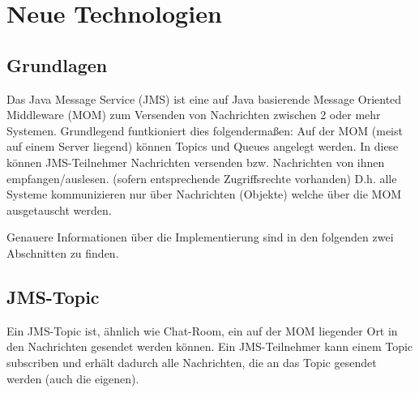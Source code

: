 \documentclass[11pt, a4paper]{article}
\begin{document}
\section{Neue Technologien}
\subsection{Grundlagen}
Das Java Message Service (JMS) ist eine auf Java basierende Message Oriented Middleware (MOM) zum Versenden von Nachrichten zwischen 2 oder mehr Systemen.
Grundlegend funtkioniert dies folgendermaßen:
Auf der MOM (meist auf einem Server liegend) können Topics und Queues angelegt werden.
In diese können JMS-Teilnehmer Nachrichten versenden bzw. Nachrichten von ihnen empfangen/auslesen. (sofern entsprechende Zugriffsrechte vorhanden)
D.h. alle Systeme kommunizieren nur über Nachrichten (Objekte) welche über die MOM ausgetauscht werden.

Genauere Informationen über die Implementierung sind in den folgenden zwei Abschnitten zu finden.

\subsection{JMS-Topic}
Ein JMS-Topic ist, ähnlich wie Chat-Room, ein auf der MOM liegender Ort in den Nachrichten gesendet werden können. Ein JMS-Teilnehmer kann einem Topic
subscriben und erhält dadurch alle Nachrichten, die an das Topic gesendet werden (auch die eigenen).
\end{document}
